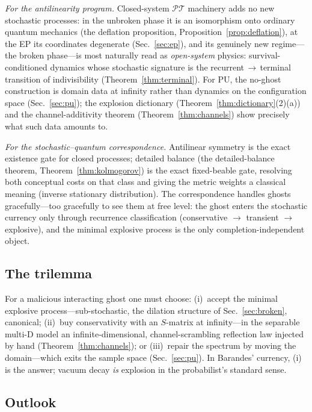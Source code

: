 \documentclass[11pt]{article}
\theoremstyle{definition}
\theoremstyle{remark}
\newcommand{\PT}{\mathcal{PT}}
\begin{document}
\emph{For the antilinearity program.} Closed-system $\PT$ machinery adds
no new stochastic processes: in the unbroken phase it is an isomorphism
onto ordinary quantum mechanics (the deflation proposition,
Proposition~\ref{prop:deflation}), at the
EP its coordinates degenerate (Sec.~\ref{sec:ep}), and its genuinely new
regime---the broken phase---is most naturally read as \emph{open-system}
physics: survival-conditioned dynamics whose stochastic signature is the
recurrent$\,\to\,$terminal transition of indivisibility
(Theorem~\ref{thm:terminal}). For PU, the no-ghost construction is domain
data at infinity rather than dynamics on the configuration space
(Sec.~\ref{sec:pu}); the explosion dictionary
(Theorem~\ref{thm:dictionary}(2)(a)) and the channel-additivity theorem
(Theorem~\ref{thm:channels}) show precisely what such data amounts to.

\emph{For the stochastic--quantum correspondence.} Antilinear symmetry is
the exact existence gate for closed processes; detailed balance
(the detailed-balance theorem, Theorem~\ref{thm:kolmogorov}) is the
exact fixed-beable gate, resolving
both conceptual costs on that class and giving the metric weights a
classical meaning (inverse stationary distribution). The correspondence
handles ghosts gracefully---too gracefully to see them at free level: the
ghost enters the stochastic currency only through recurrence
classification (conservative $\to$ transient $\to$ explosive), and the
minimal explosive process is the only completion-independent object.

\subsection{The trilemma}

For a malicious interacting ghost one must choose: (i)~accept the minimal
explosive process---sub-stochastic, the dilation structure of
Sec.~\ref{sec:broken}, canonical; (ii)~buy conservativity with an
$S$-matrix at infinity---in the separable multi-D model an infinite-dimensional,
channel-scrambling reflection law injected by hand
(Theorem~\ref{thm:channels}); or (iii)~repair the spectrum by moving the
domain---which exits the sample space (Sec.~\ref{sec:pu}). In Barandes'
currency, (i) is the answer; vacuum decay \emph{is} explosion in the
probabilist's standard sense.

\subsection{Outlook}
\end{document}

